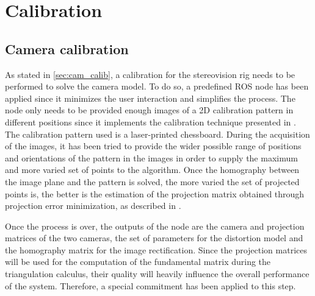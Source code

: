 \chapter{Calibration} %
\label{cha:calibration}

\section{Camera calibration} %
\label{sec:camera_calibration}
As stated in \ref{sec:cam_calib}, a calibration for the stereovision rig needs to be performed to solve the camera model.
To do so, a predefined ROS node has been applied since it minimizes the user interaction and simplifies the process. 
The node only needs to be provided enough images of a 2D calibration pattern in different positions since it implements the calibration technique presented in \cite{Zhang}. 
The calibration pattern used is a laser-printed chessboard. 
During the acquisition of the images, it has been tried to provide the wider possible range of positions and orientations of the pattern in the images in order to supply the maximum and more varied set of points to the algorithm.
Once the homography between the image plane and the pattern is solved, the more varied the set of projected points is, the better is the estimation of the projection matrix obtained through projection error minimization, as described in \cite{Hartley}. 

Once the process is over, the outputs of the node are the camera and projection matrices of the two cameras, the set of parameters for the distortion model and the homography matrix for the image rectification.
Since the projection matrices will be used for the computation of the fundamental matrix during the triangulation calculus, their quality will heavily influence the overall performance of the system. 
Therefore, a special commitment has been applied to this step. 


